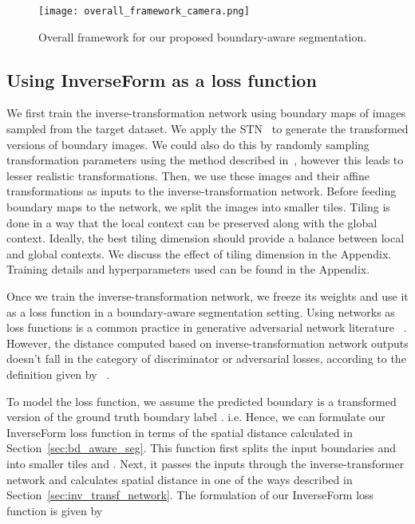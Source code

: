 \documentclass[final]{cvpr}
\begin{document}
\begin{figure*}[t]
\centering
 \texttt{[image: overall\_framework\_camera.png]}
\caption{Overall framework for our proposed boundary-aware segmentation. } \label{fig:overall_framework}
\end{figure*}

\subsection{Using InverseForm as a loss function}

We first train the inverse-transformation network using boundary maps of images sampled from the target dataset. We apply the STN~\cite{spatialtx} to generate the transformed versions of boundary images. We could also do this by randomly sampling transformation parameters using the method described in~\cite{aetv2}, however this leads to lesser realistic transformations. Then, we use these images and their affine transformations as inputs to the inverse-transformation network. Before feeding boundary maps to the network, we split the images into smaller tiles. Tiling is done in a way that the local context can be preserved along with the global context. Ideally, the best tiling dimension should provide a balance between local and global contexts. We discuss the effect of tiling dimension in the Appendix. Training details and hyperparameters used can be found in the Appendix.

Once we train the inverse-transformation network, we freeze its weights and use it as a loss function in a boundary-aware segmentation setting. Using networks as loss functions is a common practice in generative adversarial network literature ~\cite{goodfellow2014generative}. However, the distance computed based on inverse-transformation network outputs doesn't fall in the category of discriminator or adversarial losses, according to the definition given by ~\cite{adversarialdef}.

To model the loss function, we assume the predicted boundary  is a transformed version of the ground truth boundary label . i.e. 
Hence, we can formulate our InverseForm loss function in terms of the spatial distance calculated in Section~\ref{sec:bd_aware_seg}. This function first splits the input boundaries  and  into  smaller tiles  and . Next, it passes the inputs through the inverse-transformer network and calculates spatial distance in one of the ways described in Section~\ref{sec:inv_transf_network}. The formulation of our InverseForm loss function  is given by
\end{document}
